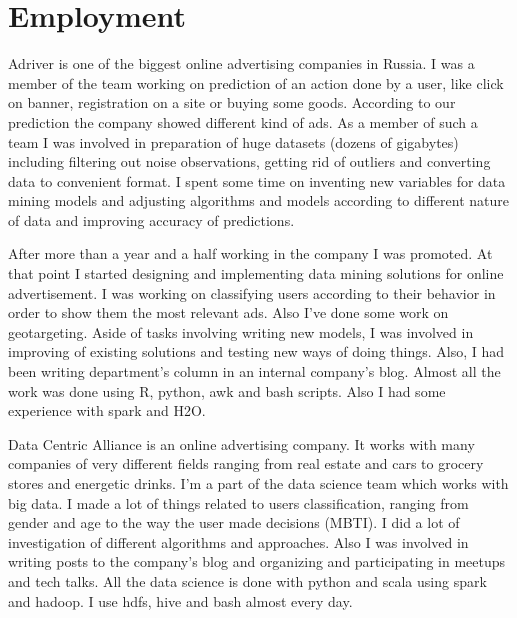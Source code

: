 \documentclass[11pt,a4paper]{moderncv-xetex}
\begin{document}
\maketitle

\section{Employment}
 \newline
    {Adriver is one of the biggest online advertising companies in Russia. I was a member of the team working on prediction of an action done by a user, like click on banner, registration on a site or buying some goods. According to our prediction the company showed different kind of ads.
    As a member of such a team I was involved in preparation of huge datasets (dozens of gigabytes) including filtering out noise observations, getting rid of outliers and converting data to convenient format. I spent some time on inventing new variables for data mining models and adjusting algorithms and models according to different nature of data and improving accuracy of predictions.}
    
 \newline
    {After more than a year and a half working in the company I was promoted. At that point I started designing and implementing data mining solutions for online advertisement. I was working on classifying users according to their behavior in order to show them the most relevant ads. Also I've done some work on geotargeting. Aside of tasks involving writing new models, I was involved in improving of existing solutions and testing new ways of doing things. Also, I had been writing department's column in an internal company's blog.\newline
    Almost all the work was done using R, python, awk and bash scripts. Also I had some experience with spark and H2O.}

 \newline
    {Data Centric Alliance is an online advertising company. It works with many companies of very different fields ranging from real estate and cars to grocery stores and energetic drinks.
    I'm a part of the data science team which works with big data. I made a lot of things related to users classification, ranging from gender and age to the way the user made decisions (MBTI). I did a lot of investigation of different algorithms and approaches. Also I was involved in writing posts to the company's blog and organizing and participating in meetups and tech talks. \newline
    All the data science is done with python and scala using spark and hadoop. I use hdfs, hive and bash almost every day.
    }
\end{document}

